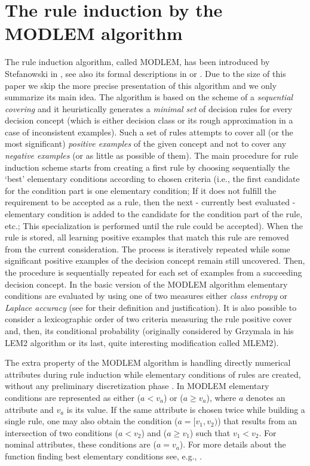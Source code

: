 \documentclass{elsart}
\begin{document}
\section{The rule induction by the MODLEM algorithm}

The rule induction algorithm, called MODLEM, has been introduced by
Stefanowski in \cite{modlem}, see also its formal descriptions in
\cite{Stef01hab} or \cite{GrzymStef}. Due to the size of this paper we skip
the  more precise presentation of this algorithm and we only summarize its
main idea. The algorithm is based on the scheme of a \emph{sequential
covering} and it heuristically generates a {\em minimal set} of decision
rules for every decision concept (which is either decision class or its
rough approximation in a case of inconsistent examples). Such a set of rules
attempts to cover all (or the most significant) \emph{positive examples} of
the given concept and not to cover any \emph{negative examples} (or as
little as possible of them). The main procedure for rule induction scheme
starts from creating a first rule by choosing sequentially the `best'
elementary conditions according to chosen criteria (i.e., the first
candidate for the condition part is one elementary condition; If it does not
fulfill the requirement to be accepted as a rule, then the next - currently
best evaluated - elementary condition is added to the candidate for the
condition part of the rule, etc.; This specialization is performed until the
rule could be accepted). When the rule is stored, all learning positive
examples that match this rule are removed from the current consideration.
The process is iteratively repeated while some significant positive examples
of the decision concept remain still uncovered. Then, the procedure is
sequentially repeated for each set of examples from a succeeding decision
concept. In the basic version of the MODLEM algorithm elementary conditions
are evaluated by using one of two measures either {\em class entropy} or
{\em Laplace accuracy} (see \cite{CN2,Stef01hab} for their definition and
justification). It is also possible to consider a lexicographic order of two
criteria measuring the rule positive cover and, then, its conditional
probability (originally considered by Grzymala in his LEM2 algorithm or its
last, quite interesting modification called MLEM2).

The extra property of the MODLEM algorithm is handling directly numerical
attributes during rule induction while elementary conditions of rules are
created, without any preliminary discretization phase \cite{GrzymStef}. In
MODLEM elementary conditions are represented as either ($a < v_a$) or ($a
\geq v_a$), where $a$ denotes an attribute and $v_a$ is its value. If the
same attribute is chosen twice while building a single rule, one may also
obtain the condition ($a = [v_1, v_2)$) that results from an intersection of
two conditions ($a < v_2$) and ($a \geq v_1$) such that $v_1 < v_2$. For
nominal attributes, these conditions are ($a = v_a$). For more details about
the function finding best elementary conditions see, e.g.,
\cite{GrzymStef,modlem}.
\end{document}

